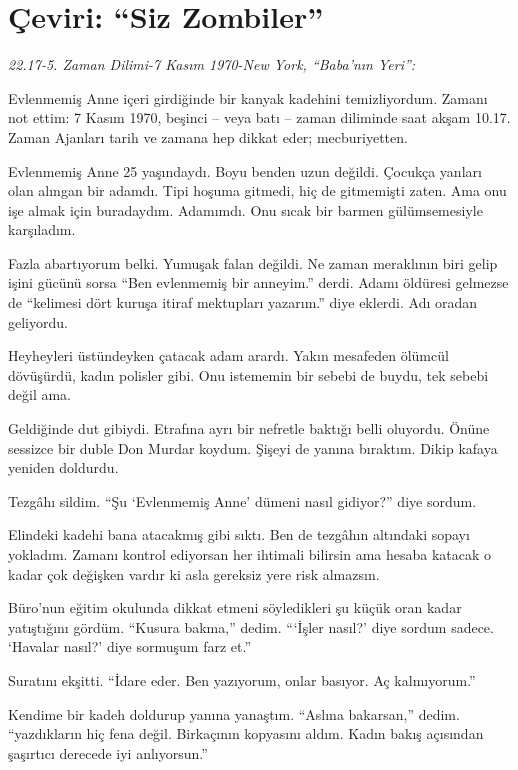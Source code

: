
\chapter{Çeviri: ``Siz Zombiler''}

\noindent\emph{22.17-5. Zaman Dilimi-7 Kasım 1970-New York, ``Baba'nın Yeri'':}

Evlenmemiş Anne içeri girdiğinde bir kanyak kadehini temizliyordum. Zamanı not
ettim: 7 Kasım 1970, beşinci -- veya batı -- zaman diliminde saat akşam 10.17.
Zaman Ajanları tarih ve zamana hep dikkat eder; mecburiyetten.

Evlenmemiş Anne 25 yaşındaydı. Boyu benden uzun değildi. Çocukça yanları olan
alıngan bir adamdı. Tipi hoşuma gitmedi, hiç de gitmemişti zaten. Ama onu işe
almak için buradaydım. Adamımdı. Onu sıcak bir barmen gülümsemesiyle karşıladım.

Fazla abartıyorum belki. Yumuşak falan değildi. Ne zaman meraklının biri gelip
işini gücünü sorsa ``Ben evlenmemiş bir anneyim.'' derdi. Adamı öldüresi
gelmezse de ``kelimesi dört kuruşa itiraf mektupları yazarım.'' diye eklerdi.
Adı oradan geliyordu.

Heyheyleri üstündeyken çatacak adam arardı. Yakın mesafeden ölümcül dövüşürdü,
kadın polisler gibi. Onu istememin bir sebebi de buydu, tek sebebi değil ama.

Geldiğinde dut gibiydi. Etrafına ayrı bir nefretle baktığı belli oluyordu.
Önüne sessizce bir duble Don Murdar koydum. Şişeyi de yanına bıraktım. Dikip
kafaya yeniden doldurdu.

Tezgâhı sildim. ``Şu `Evlenmemiş Anne' dümeni nasıl gidiyor?'' diye sordum.

Elindeki kadehi bana atacakmış gibi sıktı. Ben de tezgâhın altındaki sopayı
yokladım. Zamanı kontrol ediyorsan her ihtimali bilirsin ama hesaba katacak o
kadar çok değişken vardır ki asla gereksiz yere risk almazsın.

Büro'nun eğitim okulunda dikkat etmeni söyledikleri şu küçük oran kadar
yatıştığını gördüm. ``Kusura bakma,'' dedim. ```İşler nasıl?' diye sordum
sadece. `Havalar nasıl?' diye sormuşum farz et.''

Suratını ekşitti. ``İdare eder. Ben yazıyorum, onlar basıyor. Aç kalmıyorum.''

Kendime bir kadeh doldurup yanına yanaştım. ``Aslına bakarsan,'' dedim.
``yazdıkların hiç fena değil. Birkaçının kopyasını aldım. Kadın bakış açısından
şaşırtıcı derecede iyi anlıyorsun.''

